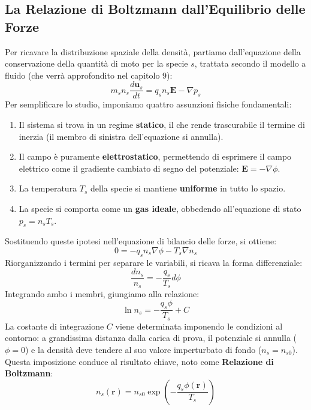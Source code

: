 \subsection{La Relazione di Boltzmann dall'Equilibrio delle Forze}
Per ricavare la distribuzione spaziale della densità, partiamo dall'equazione della conservazione della quantità di moto per la specie $s$, trattata secondo il modello a fluido (che verrà approfondito nel capitolo 9):
\begin{equation}
m_s n_s \frac{d\mathbf{u}_s}{dt} = q_s n_s \mathbf{E} - \nabla p_s
\end{equation}
Per semplificare lo studio, imponiamo quattro assunzioni fisiche fondamentali:
\begin{enumerate}
\item Il sistema si trova in un regime \textbf{statico}, il che rende trascurabile il termine di inerzia (il membro di sinistra dell'equazione si annulla).
\item Il campo è puramente \textbf{elettrostatico}, permettendo di esprimere il campo elettrico come il gradiente cambiato di segno del potenziale: $\mathbf{E} = -\nabla\phi$.
\item La temperatura $T_s$ della specie si mantiene \textbf{uniforme} in tutto lo spazio.
\item La specie si comporta come un \textbf{gas ideale}, obbedendo all'equazione di stato $p_s = n_s T_s$.
\end{enumerate}

Sostituendo queste ipotesi nell'equazione di bilancio delle forze, si ottiene:
\begin{equation}
0 = -q_s n_s \nabla\phi - T_s \nabla n_s
\end{equation}
Riorganizzando i termini per separare le variabili, si ricava la forma differenziale:
\begin{equation}
\frac{dn_s}{n_s} = -\frac{q_s}{T_s} d\phi
\end{equation}
Integrando ambo i membri, giungiamo alla relazione:
\begin{equation}
\ln n_s = -\frac{q_s \phi}{T_s} + C
\end{equation}
La costante di integrazione $C$ viene determinata imponendo le condizioni al contorno: a grandissima distanza dalla carica di prova, il potenziale si annulla ($\phi = 0$) e la densità deve tendere al suo valore imperturbato di fondo ($n_s = n_{s0}$). Questa imposizione conduce al risultato chiave, noto come \textbf{Relazione di Boltzmann}:
\begin{equation}
n_s(\mathbf{r}) = n_{s0} \exp\left(-\frac{q_s \phi(\mathbf{r})}{T_s}\right)
\end{equation}

